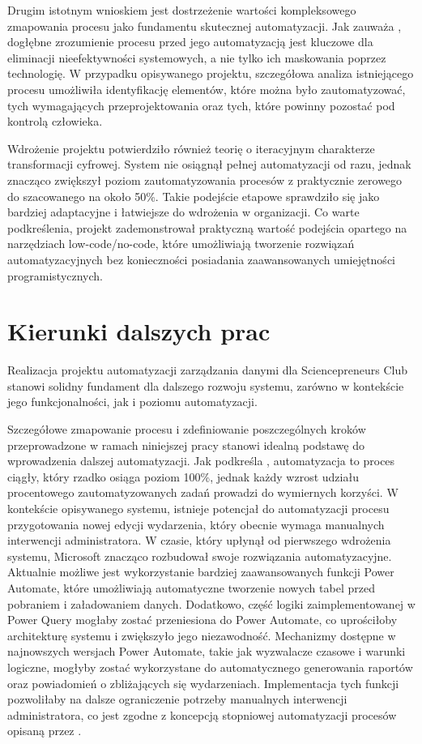 Drugim istotnym wnioskiem jest dostrzeżenie wartości kompleksowego zmapowania procesu jako fundamentu skutecznej automatyzacji. Jak zauważa \cite{brzezinski2002}, dogłębne zrozumienie procesu przed jego automatyzacją jest kluczowe dla eliminacji nieefektywności systemowych, a nie tylko ich maskowania poprzez technologię. W przypadku opisywanego projektu, szczegółowa analiza istniejącego procesu umożliwiła identyfikację elementów, które można było zautomatyzować, tych wymagających przeprojektowania oraz tych, które powinny pozostać pod kontrolą człowieka.

Wdrożenie projektu potwierdziło również teorię \cite{szmitka2015} o iteracyjnym charakterze transformacji cyfrowej. System nie osiągnął pełnej automatyzacji od razu, jednak znacząco zwiększył poziom zautomatyzowania procesów z praktycznie zerowego do szacowanego na około 50\%. Takie podejście etapowe sprawdziło się jako bardziej adaptacyjne i łatwiejsze do wdrożenia w organizacji.
Co warte podkreślenia, projekt zademonstrował praktyczną wartość podejścia opartego na narzędziach low-code/no-code, które umożliwiają tworzenie rozwiązań automatyzacyjnych bez konieczności posiadania zaawansowanych umiejętności programistycznych. 

\section{Kierunki dalszych prac}
Realizacja projektu automatyzacji zarządzania danymi dla Sciencepreneurs Club stanowi solidny fundament dla dalszego rozwoju systemu, zarówno w kontekście jego funkcjonalności, jak i poziomu automatyzacji. 

Szczegółowe zmapowanie procesu i zdefiniowanie poszczególnych kroków przeprowadzone w ramach niniejszej pracy stanowi idealną podstawę do wprowadzenia dalszej automatyzacji. Jak podkreśla \cite{brzezinski2002}, automatyzacja to proces ciągły, który rzadko osiąga poziom 100\%, jednak każdy wzrost udziału procentowego zautomatyzowanych zadań prowadzi do wymiernych korzyści. W kontekście opisywanego systemu, istnieje potencjał do automatyzacji procesu przygotowania nowej edycji wydarzenia, który obecnie wymaga manualnych interwencji administratora. 
W czasie, który upłynął od pierwszego wdrożenia systemu, Microsoft znacząco rozbudował swoje rozwiązania automatyzacyjne. Aktualnie możliwe jest wykorzystanie bardziej zaawansowanych funkcji Power Automate, które umożliwiają automatyczne tworzenie nowych tabel przed pobraniem i załadowaniem danych. Dodatkowo, część logiki zaimplementowanej w Power Query mogłaby zostać przeniesiona do Power Automate, co uprościłoby architekturę systemu i zwiększyło jego niezawodność. Mechanizmy dostępne w najnowszych wersjach Power Automate, takie jak wyzwalacze czasowe i warunki logiczne, mogłyby zostać wykorzystane do automatycznego generowania raportów oraz powiadomień o zbliżających się wydarzeniach. Implementacja tych funkcji pozwoliłaby na dalsze ograniczenie potrzeby manualnych interwencji administratora, co jest zgodne z koncepcją stopniowej automatyzacji procesów opisaną przez \cite{gupta2023}.

